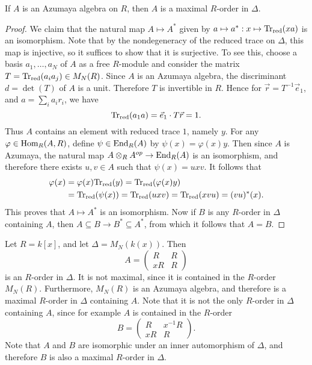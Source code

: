 \begin{prop}
If $A$ is an Azumaya algebra on $R$, then $A$ is a maximal $R$-order in $\Delta$.
\end{prop}
\begin{proof}
We claim that the natural map $A\mapsto A^*$ given by $a\mapsto a^*: x\mapsto \textnormal{Tr}_{\text{red}}(xa)$ is an isomorphism.  Note that by the nondegeneracy of the reduced trace on $\Delta$, this map is injective, so it suffices to show that it is surjective.  To see this, choose a basis $a_1,\dots, a_N$ of $A$ as a free $R$-module and consider the matrix $T = \textnormal{Tr}_{\text{red}}(a_ia_j)\in M_N(R)$.  Since $A$ is an Azumaya algebra, the discriminant $d = \det(T)$ of $A$ is a unit.  Therefore $T$ is invertible in $R$.  Hence for $\vec r = T^{-1}\vec e_1$, and $a = \sum_i a_ir_i$, we have
$$\textnormal{Tr}_{\text{red}}(a_1a) = \vec e_1\cdot T\vec r = 1.$$
Thus $A$ contains an element with reduced trace $1$, namely $y$.  For any $\varphi\in\textnormal{Hom}_R(A,R)$, define $\psi\in\textnormal{End}_R(A)$ by $\psi(x) = \varphi(x)y$.  Then since $A$ is Azumaya, the natural map $A\otimes_RA^{op}\rightarrow\textnormal{End}_R(A)$ is an isomorphism, and therefore there exists $u,v\in A$ such that $\psi(x) = uxv$.  It follows that
\begin{align*}
\varphi(x)
  & = \varphi(x)\textnormal{Tr}_{\text{red}}(y) = \textnormal{Tr}_{\text{red}}(\varphi(x)y)\\
  & = \textnormal{Tr}_{\text{red}}(\psi(x)) = \textnormal{Tr}_{\text{red}}(uxv) = \textnormal{Tr}_{\text{red}}(xvu) = (vu)^*(x).
\end{align*}
This proves that $A\mapsto A^*$ is an isomorphism.  Now if $B$ is any $R$-order in $\Delta$ containing $A$, then $A\subseteq B\rightarrow B^*\subseteq A^*$, from which it follows that $A = B$.
\end{proof}

\begin{ex}
Let $R = k[x]$, and let $\Delta = M_N(k(x))$.  Then
$$A = \left(\begin{array}{cc}
 R & R\\
xR & R
\end{array}\right)$$
is an $R$-order in $\Delta$.  It is not maximal, since it is contained in the $R$-order $M_N(R)$.  Furthermore, $M_N(R)$ is an Azumaya algebra, and therefore is a maximal $R$-order in $\Delta$ containing $A$.  Note that it is not the only $R$-order in $\Delta$ containing $A$, since for example $A$ is contained in the $R$-order
$$B = \left(\begin{array}{cc}
 R & x^{-1}R\\
xR & R
\end{array}\right).$$
Note that $A$ and $B$ are isomorphic under an inner automorphism of $\Delta$, and therefore $B$ is also a maximal $R$-order in $\Delta$.
\end{ex}

